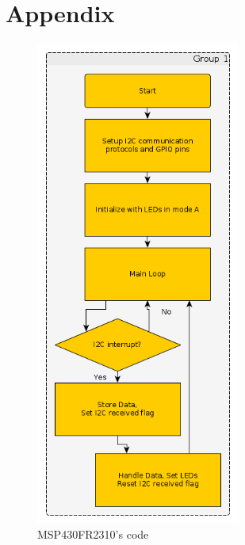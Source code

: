 \documentclass{article}
\begin{document}

\pagebreak

\section*{Appendix}

\begin{centering}
\begin{figure}[H]
\centering
\includegraphics[width = 0.6\textwidth]{flowchart.png}
\captionsetup{format = hang, width = 0.75\textwidth}
\caption{MSP430FR2310's code}
\label{fig:Flowchart}
\end{figure}
\end{centering}
\end{document}
